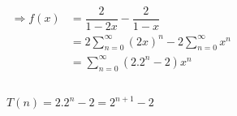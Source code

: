 \documentclass[12pt, letterpaper]{article}
\begin{document}
\begin{enumerate}
    $\begin{aligned}
        \Rightarrow f(x) &= \dfrac{2}{1-2x} - \dfrac{2}{1-x} \\
                        &= 2\sum_{n=0}^{\infty} (2x)^n - 2\sum_{n=0}^{\infty} x^n \\
                        &= \sum_{n=0}^{\infty} (2.2^n - 2)x^n \\
    \end{aligned}$ \\
     \\
    $T(n) = 2.2^n - 2 = 2^{n+1} - 2$
\end{enumerate}
\end{document}
